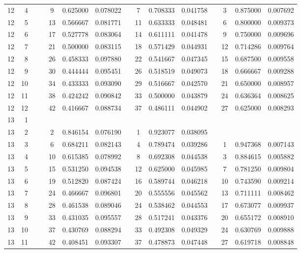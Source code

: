 \begin{appendix}
\begin{longtable}[h]{rrrcccccccccccc}
12	&	4	&&&	9	&	0.625000	&	0.078022	&&	7	&	0.708333	&	0.041758	&&	3	&	0.875000	&	0.007692	\\
12	&	5	&&&	13	&	0.566667	&	0.081771	&&	11	&	0.633333	&	0.048481	&&	6	&	0.800000	&	0.009373	\\
12	&	6	&&&	17	&	0.527778	&	0.083064	&&	14	&	0.611111	&	0.041478	&&	9	&	0.750000	&	0.009696	\\
12	&	7	&&&	21	&	0.500000	&	0.083115	&&	18	&	0.571429	&	0.044931	&&	12	&	0.714286	&	0.009764	\\
12	&	8	&&&	26	&	0.458333	&	0.097880	&&	22	&	0.541667	&	0.047345	&&	15	&	0.687500	&	0.009558	\\
12	&	9	&&&	30	&	0.444444	&	0.095451	&&	26	&	0.518519	&	0.049073	&&	18	&	0.666667	&	0.009288	\\
12	&	10	&&&	34	&	0.433333	&	0.093090	&&	29	&	0.516667	&	0.042570	&&	21	&	0.650000	&	0.008957	\\
12	&	11	&&&	38	&	0.424242	&	0.090842	&&	33	&	0.500000	&	0.043879	&&	24	&	0.636364	&	0.008625	\\
12	&	12	&&&	42	&	0.416667	&	0.088734	&&	37	&	0.486111	&	0.044902	&&	27	&	0.625000	&	0.008293	\\
13	&	1	&&&		&		&		&&		&		&		&&		&		&		\\
13	&	2	&&&	2	&	0.846154	&	0.076190	&&	1	&	0.923077	&	0.038095	&&		&		&		\\
13	&	3	&&&	6	&	0.684211	&	0.082143	&&	4	&	0.789474	&	0.039286	&&	1	&	0.947368	&	0.007143	\\
13	&	4	&&&	10	&	0.615385	&	0.078992	&&	8	&	0.692308	&	0.044538	&&	3	&	0.884615	&	0.005882	\\
13	&	5	&&&	15	&	0.531250	&	0.094538	&&	12	&	0.625000	&	0.045985	&&	7	&	0.781250	&	0.009804	\\
13	&	6	&&&	19	&	0.512820	&	0.087424	&&	16	&	0.589744	&	0.046218	&&	10	&	0.743590	&	0.009214	\\
13	&	7	&&&	24	&	0.466667	&	0.096801	&&	20	&	0.555556	&	0.045562	&&	13	&	0.711111	&	0.008462	\\
13	&	8	&&&	28	&	0.461538	&	0.089046	&&	24	&	0.538462	&	0.044553	&&	17	&	0.673077	&	0.009937	\\
13	&	9	&&&	33	&	0.431035	&	0.095557	&&	28	&	0.517241	&	0.043376	&&	20	&	0.655172	&	0.008910	\\
13	&	10	&&&	37	&	0.430769	&	0.088294	&&	33	&	0.492308	&	0.049329	&&	24	&	0.630769	&	0.009888	\\
13	&	11	&&&	42	&	0.408451	&	0.093307	&&	37	&	0.478873	&	0.047448	&&	27	&	0.619718	&	0.008848	\\

\end{longtable}
\end{appendix}
